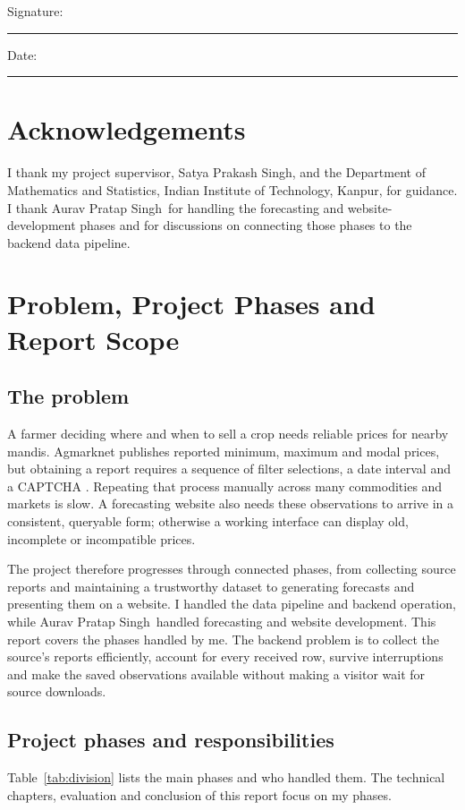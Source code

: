\documentclass[12pt,a4paper,oneside]{report}
\newcommand{\auravname}{Aurav Pratap Singh}
\newcommand{\supervisor}{Satya Prakash Singh}
\newcommand{\department}{Department of Mathematics and Statistics}
\newcommand{\institution}{Indian Institute of Technology, Kanpur}
\numberwithin{equation}{chapter}
\numberwithin{figure}{chapter}
\numberwithin{table}{chapter}
\theoremstyle{definition}
\begin{document}
\noindent Signature: \rule{7cm}{0.4pt}
\vspace{0.8cm}

\noindent Date: \rule{4cm}{0.4pt}

\clearpage
\chapter*{Acknowledgements}
I thank my project supervisor, \supervisor, and the \department, \institution, for guidance. I thank \auravname\ for handling the forecasting and website-development phases and for discussions on connecting those phases to the backend data pipeline.

\clearpage
{}
\setcounter{page}{1}

\chapter{Problem, Project Phases and Report Scope}

\section{The problem}
A farmer deciding where and when to sell a crop needs reliable prices for nearby mandis. Agmarknet publishes reported minimum, maximum and modal prices, but obtaining a report requires a sequence of filter selections, a date interval and a CAPTCHA \cite{agmarknet}. Repeating that process manually across many commodities and markets is slow. A forecasting website also needs these observations to arrive in a consistent, queryable form; otherwise a working interface can display old, incomplete or incompatible prices.

The project therefore progresses through connected phases, from collecting source reports and maintaining a trustworthy dataset to generating forecasts and presenting them on a website. I handled the data pipeline and backend operation, while \auravname\ handled forecasting and website development. This report covers the phases handled by me. The backend problem is to collect the source's reports efficiently, account for every received row, survive interruptions and make the saved observations available without making a visitor wait for source downloads.

\section{Project phases and responsibilities}
Table~\ref{tab:division} lists the main phases and who handled them. The technical chapters, evaluation and conclusion of this report focus on my phases.
\end{document}
